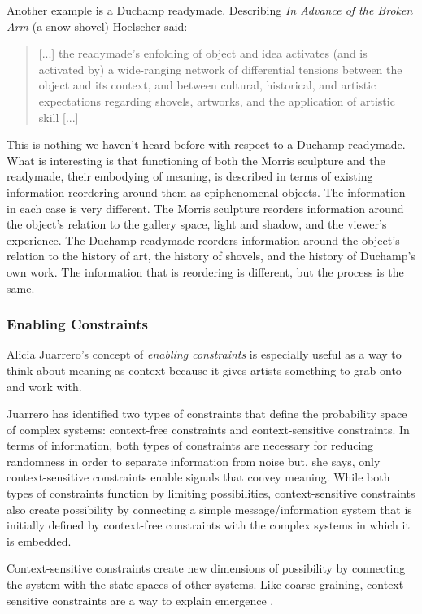 \documentclass[letterpaper]{article}
\begin{document}
    Another example is a Duchamp readymade. Describing \emph{In Advance of the Broken Arm} (a snow shovel) Hoelscher said:

    \begin{quote}
        [...] the readymade's enfolding of object and idea activates (and is activated by) a wide-ranging network of differential tensions between the object and its context, and between cultural, historical, and artistic expectations regarding shovels, artworks, and the application of artistic skill [...]
    \end{quote}

    This is nothing we haven't heard before with respect to a Duchamp readymade. What is interesting is that functioning of both the Morris sculpture and the readymade, their embodying of meaning, is described in terms of existing information reordering around them as epiphenomenal objects. The information in each case is very different. The Morris sculpture reorders information around the object's relation to the gallery space, light and shadow, and the viewer's experience. The Duchamp readymade reorders information around the object's relation to the history of art, the history of shovels, and the history of Duchamp's own work. The information that is reordering is different, but the process is the same.

    \subsubsection{Enabling Constraints}

    Alicia Juarrero's concept of \emph{enabling constraints} is especially useful as a way to think about meaning as context because it gives artists something to grab onto and work with.
    
    Juarrero has identified two types of constraints that define the probability space of complex systems: context-free constraints and context-sensitive constraints. In terms of information, both types of constraints are necessary for reducing randomness in order to separate information from noise but, she says, only context-sensitive constraints enable signals that convey meaning. While both types of constraints function by limiting possibilities, context-sensitive constraints also create possibility by connecting a simple message/information system that is initially defined by context-free constraints with the complex systems in which it is embedded.
    
    Context-sensitive constraints create new dimensions of possibility by connecting the system with the state-spaces of other systems. Like coarse-graining, context-sensitive constraints are a way to explain emergence \citep[p.193]{JuarreroThSlfOrgnstnOfIntntnlActn2004} \citep[p.240]{JuarreroCsltyAsCnstrnt1998}.
\end{document}
